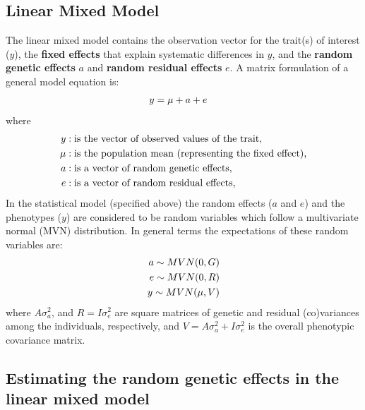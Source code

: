 \documentclass[
]{article}
\begin{document}
\subsection{Linear Mixed Model}\label{mixedlineareffectsmodel}

The linear mixed model contains the observation vector for the trait(s) of interest (\(y\)), the \textbf{fixed effects} that explain systematic differences in \(y\), and the \textbf{random genetic effects} \(a\) and \textbf{random residual effects} \(e\). A matrix formulation of a general model equation is:
\begin{align}
y &= \mu + a + e \notag
\end{align}
where
\begin{align}
y &: \text{is the vector of observed values of the trait,} \notag \\
\mu &: \text{is the population mean (representing the fixed effect),} \notag \\
a &: \text{is a vector of random genetic effects,} \notag \\
e &: \text{is a vector of random residual effects,} \notag
\end{align}
In the statistical model (specified above) the random effects (\(a\) and \(e\)) and the phenotypes (\(y\)) are considered to be random variables which follow a multivariate normal (MVN) distribution. In general terms the expectations of these random variables are:\\
\begin{align}
a \sim MVN(0,G) \notag \\
e \sim MVN(0,R) \notag \\
y \sim MVN(\mu,V) \notag
\end{align}
where \(A\sigma_a^2\), and \(R=I\sigma_e^2\) are square matrices of genetic and residual (co)variances among the individuals, respectively, and \(V=A\sigma_a^2+I\sigma_e^2\) is the overall phenotypic covariance matrix.

\subsection{Estimating the random genetic effects in the linear mixed model}\label{estimating-the-random-genetic-effects-in-the-linear-mixed-model}
\end{document}
